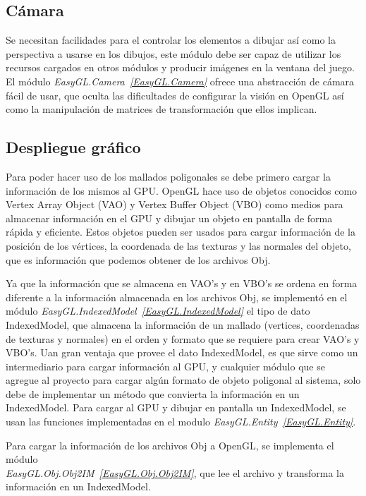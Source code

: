 \subsection{Cámara}

Se necesitan facilidades para el controlar los elementos a dibujar así como la perspectiva a usarse en los dibujos, este módulo debe ser capaz de utilizar los recursos cargados en otros módulos y producir imágenes en la ventana del juego. El módulo \emph{EasyGL.Camera~\ref{EasyGL.Camera}} ofrece una abstracción de cámara fácil de usar, que oculta las dificultades de configurar la visión en OpenGL así como la manipulación de matrices de transformación que ellos implican.

\subsection{Despliegue gráfico}

Para poder hacer uso de los mallados poligonales se debe primero cargar la información de los mismos al GPU. OpenGL hace uso de objetos conocidos como Vertex Array Object (VAO) y Vertex Buffer Object (VBO) como medios para almacenar información en el GPU y dibujar un objeto en pantalla de forma rápida y eficiente. Estos objetos pueden ser usados para cargar información de la posición de los vértices, la coordenada de las texturas y las normales del objeto, que es información que podemos obtener de los archivos Obj.

Ya que la información que se almacena en VAO's y en VBO's se ordena en forma diferente a la información almacenada en los archivos Obj, se implementó en el módulo \emph{EasyGL.IndexedModel~\ref{EasyGL.IndexedModel}} el tipo de dato IndexedModel, que almacena la información de un mallado (vertices, coordenadas de texturas y normales) en el orden y formato que se requiere para crear VAO's y VBO's. Uan gran ventaja que provee el dato IndexedModel, es que sirve como un intermediario para cargar información al GPU, y cualquier módulo que se agregue al proyecto para cargar algún formato de objeto poligonal al sistema, solo debe de implementar un método que convierta la información en un IndexedModel. Para cargar al GPU y dibujar en pantalla un IndexedModel, se usan las funciones implementadas en el modulo \emph{EasyGL.Entity~\ref{EasyGL.Entity}}.

Para cargar la información de los archivos Obj a OpenGL, se implementa el módulo \\\emph{EasyGL.Obj.Obj2IM~\ref{EasyGL.Obj.Obj2IM}}, que lee el archivo y transforma la información en un IndexedModel.

